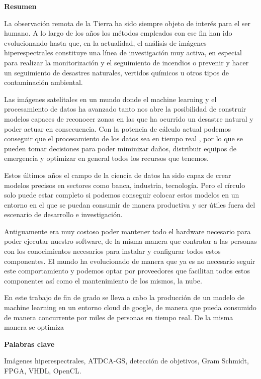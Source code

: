 
\cleardoublepage
\begin{center}

{\bf \Huge Resumen}

  \end{center}
  
La observación remota de la Tierra ha sido siempre objeto de interés para el ser humano. A lo largo de los años los métodos empleados con ese fin han ido evolucionando hasta que, en la actualidad, el análisis de imágenes hiperespectrales constituye una línea de investigación muy activa, en especial para realizar la monitorización y el seguimiento de incendios o prevenir y hacer un seguimiento de desastres naturales, vertidos químicos u otros tipos de contaminación ambiental.

Las imágenes satelitales en un mundo donde el machine learning y el procesamiento de datos ha avanzado tanto nos abre la posibilidad de construir modelos capaces de reconocer zonas en las que ha ocurrido un desastre natural y poder actuar en consecuencia. Con la potencia de cálculo actual podemos conseguir que el procesamiento de los datos sea en tiempo real , por lo que se pueden tomar decisiones para poder miminizar daños, distribuir equipos de emergencia y optimizar en general todos los recursos que tenemos.

Estos últimos años el campo de la ciencia de datos ha sido capaz de crear modelos precisos en sectores como banca, industria, tecnología. Pero el círculo solo puede estar completo si podemos conseguir colocar estos modelos en un entorno en el que se puedan consumir de manera productiva y ser útiles fuera del escenario de desarrollo e investigación.

Antiguamente era muy costoso poder mantener todo el hardware necesario para poder ejecutar nuestro software, de la misma manera que contratar a las personas con los conocimientos necesarios para instalar y configurar todos estos componentes. El mundo ha evolucionado de manera que ya es no necesario seguir este comportamiento y podemos optar por proveedores que facilitan todos estos componentes así como el mantenimiento de los mismos, la nube.

En este trabajo de fin de grado se lleva a cabo la producción de un modelo de machine learning en un entorno cloud de google, de manera que pueda consumido de manera concurrente por miles de personas en tiempo real.
De la misma manera se optimiza

\vspace{0.8cm}



\begin{center}


{\bf \Large Palabras clave}

   \end{center}
   
Imágenes hiperespectrales, ATDCA-GS, detección de objetivos, Gram Schmidt, FPGA, VHDL, OpenCL.

   \vspace{0.3cm}
   